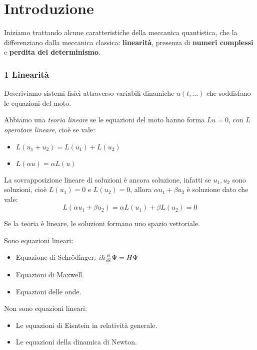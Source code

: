 

\chapter{Introduzione}


Iniziamo trattando alcune caratteristiche della meccanica quantistica, 
che la differenziano dalla meccanica classica: \textbf{linearità}, presenza di \textbf{numeri complessi} e \textbf{perdita del determinismo}.


\subsection*{1 Linearità}

Descriviamo sistemi fisici attraverso variabili dinamiche \(u(t,\dots)\) che soddisfano le equazioni del moto.
\begin{definition}
    Abbiamo una \textit{teoria lineare} se le equazioni del moto hanno forma \(L u=0\), con \(L \) \textit{operatore lineare}, 
    cioè se vale:
    \begin{itemize}
        \item \(L(u_1+u_2)= L(u_1)+L(u_2)\)
        \item \(L(\alpha u)= \alpha L (u)\)
    \end{itemize}
\end{definition}

\begin{remark}
    La sovrapposizione lineare di soluzioni è ancora soluzione, infatti
    se \(u_1,u_2\) sono soluzioni, cioè \(L(u_1)=0\) e \(L(u_2)=0\), allora \(\alpha u_1+\beta u_2\) è soluzione dato che vale:
    \[L(\alpha u_1+\beta u_2)= \alpha L(u_1)+ \beta L(u_2)=0
    \] 
\end{remark}
\begin{remark}
    Se la teoria è lineare, le soluzioni formano uno spazio vettoriale.
\end{remark}    

\begin{example}
    Sono equazioni lineari:
    \begin{itemize}
        \item Equazione di Schrödinger: \(i\hbar \dv{t}\Psi= H \Psi\)
        \item Equazioni di Maxwell.
        \item Equazioni delle onde.
    \end{itemize}
\end{example}
\begin{example}
    Non sono equazioni lineari:
    \begin{itemize}
        \item Le equazioni di Eisntein in relatività generale.
        \item Le equazioni della dinamica di Newton.
    \end{itemize}
\end{example}


